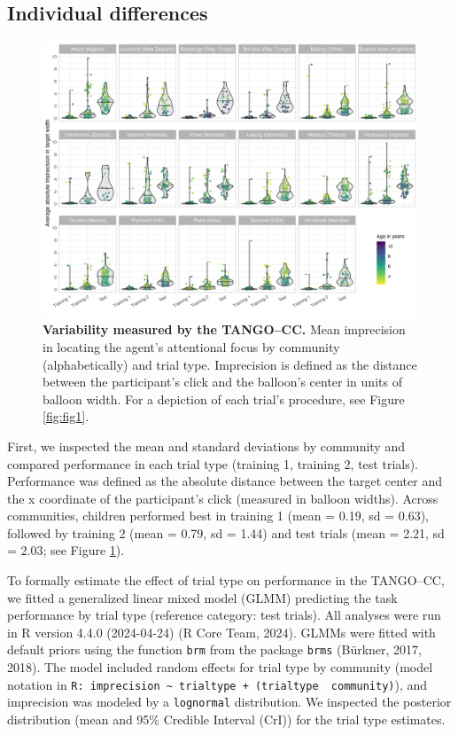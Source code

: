 \documentclass[
  man,floatsintext]{apa7}
\begin{document}
\subsection{Individual differences}\label{individual-differences}



\begin{figure}

{\centering \includegraphics[width=1\linewidth]{../figures/tango-cc-variability} 

}

\caption{\textbf{Variability measured by the TANGO--CC.} Mean imprecision in locating the agent's attentional focus by community (alphabetically) and trial type. Imprecision is defined as the distance between the participant's click and the balloon's center in units of balloon width. For a depiction of each trial's procedure, see Figure \ref{fig:fig1}.}\label{fig:fig3}
\end{figure}

First, we inspected the mean and standard deviations by community and compared performance in each trial type (training 1, training 2, test trials).
Performance was defined as the absolute distance between the target center and the x coordinate of the participant's click (measured in balloon widths).
Across communities, children performed best in training 1 (mean = 0.19, sd = 0.63), followed by training 2 (mean = 0.79, sd = 1.44) and test trials (mean = 2.21, sd = 2.03; see Figure \ref{fig:fig3}).

To formally estimate the effect of trial type on performance in the TANGO--CC, we fitted a generalized linear mixed model (GLMM) predicting the task performance by trial type (reference category: test trials).
All analyses were run in R version 4.4.0 (2024-04-24) (R Core Team, 2024).
GLMMs were fitted with default priors using the function \texttt{brm} from the package \texttt{brms} (Bürkner, 2017, 2018).
The model included random effects for trial type by community (model notation in \texttt{R:\ imprecision\ \textasciitilde{}\ trialtype\ +\ (trialtype\ \textbar{}\ community)}), and imprecision was modeled by a \texttt{lognormal} distribution.
We inspected the posterior distribution (mean and 95\% Credible Interval (CrI)) for the trial type estimates.
\end{document}
